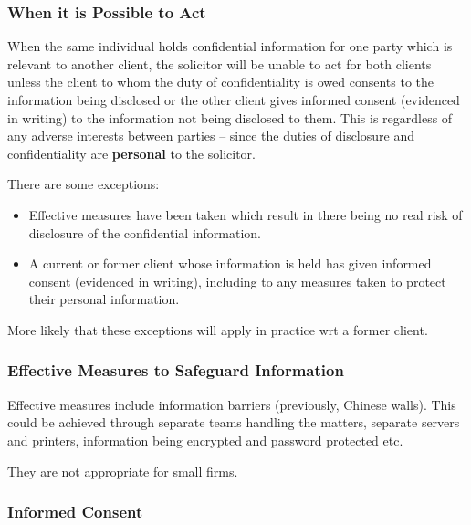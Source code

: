 \documentclass[
]{article}
\providecommand{\tightlist}{%
  \setlength{\itemsep}{0pt}\setlength{\parskip}{0pt}}
\begin{document}
\hypertarget{when-it-is-possible-to-act}{%
\subsubsection{When it is Possible to
Act}\label{when-it-is-possible-to-act}}

When the same individual holds confidential information for one party
which is relevant to another client, the solicitor will be unable to act
for both clients unless the client to whom the duty of confidentiality
is owed consents to the information being disclosed or the other client
gives informed consent (evidenced in writing) to the information not
being disclosed to them. This is regardless of any adverse interests
between parties -- since the duties of disclosure and confidentiality
are \textbf{personal} to the solicitor.

There are some exceptions:

\begin{itemize}
\tightlist
\item
  Effective measures have been taken which result in there being no real
  risk of disclosure of the confidential information.
\item
  A current or former client whose information is held has given
  informed consent (evidenced in writing), including to any measures
  taken to protect their personal information.
\end{itemize}

More likely that these exceptions will apply in practice wrt a former
client.

\hypertarget{effective-measures-to-safeguard-information}{%
\subsubsection{Effective Measures to Safeguard
Information}\label{effective-measures-to-safeguard-information}}

Effective measures include information barriers (previously, Chinese
walls). This could be achieved through separate teams handling the
matters, separate servers and printers, information being encrypted and
password protected etc.

They are not appropriate for small firms.

\hypertarget{informed-consent}{%
\subsubsection{Informed Consent}\label{informed-consent}}
\end{document}
